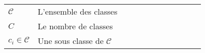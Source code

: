 \begin{tabular}{l p{0.85\linewidth}}
	$ \mathcal{C} $ & L'ensemble des classes \\
	$ C $ & Le nombre de classes \\
	$ \mathit{c_i} \in \mathcal{C}  $ & Une sous classe de $\mathcal{C}$ \\
	
	
\end{tabular}
